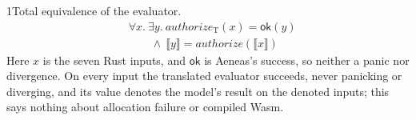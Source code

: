 \begin{perchstatement}{1}{Total equivalence of the evaluator.}\label{stmt:total-equivalence-of-the-evaluator}
\[\begin{aligned}&\forall x.\ \exists y.\ \mathit{authorize}_{\mathrm{T}}(x) = \mathsf{ok}(y)\\
&\qquad \land\ \llbracket y \rrbracket = \mathit{authorize}(\llbracket x \rrbracket)\end{aligned}\]
Here \(x\) is the seven Rust inputs, and \(\mathsf{ok}\) is Aeneas's success, so neither a panic nor divergence. On every input the translated evaluator succeeds, never panicking or diverging, and its value denotes the model's result on the denoted inputs; this says nothing about allocation failure or compiled Wasm.
\end{perchstatement}
